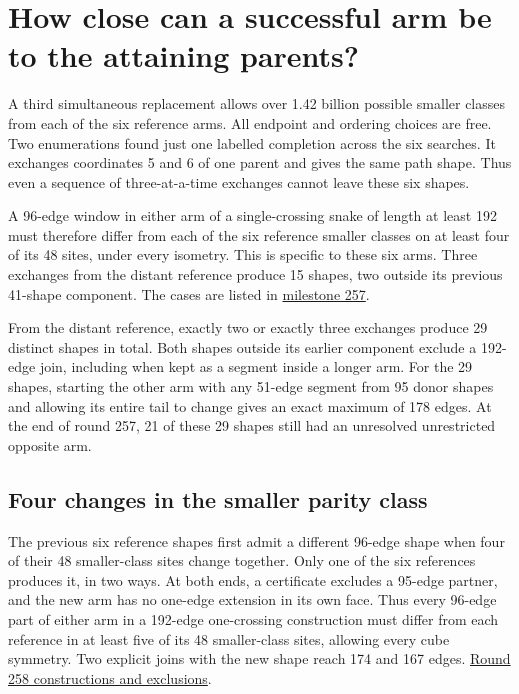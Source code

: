 \documentclass[11pt,a4paper]{article}
\begin{document}
\section{How close can a successful arm be to the attaining parents?}
A third simultaneous replacement allows over 1.42 billion possible
smaller classes from each of the six reference arms. All endpoint and
ordering choices are free. Two enumerations found just one labelled
completion across the six searches. It exchanges coordinates 5 and 6
of one parent and gives the same path shape. Thus even a sequence of
three-at-a-time exchanges cannot leave these six shapes.

A 96-edge window in either arm of a single-crossing snake of length at
least 192 must therefore differ from each of the six reference smaller
classes on at least four of its 48 sites, under every isometry. This is
specific to these six arms. Three exchanges from the distant reference
produce 15 shapes, two outside its previous 41-shape component.
The cases are listed in \href{https://github.com/hironaka-iori/Snake-in-the-box-in-9/tree/main/milestones/257-three-exchange-parents}{milestone 257}.

From the distant reference, exactly two or exactly three exchanges
produce 29 distinct shapes in total. Both shapes outside its earlier
component exclude a 192-edge join, including when kept as a segment
inside a longer arm. For the 29 shapes, starting the other arm with
any 51-edge segment from 95 donor shapes and allowing its entire tail
to change gives an exact maximum of 178 edges. At the end of round 257, 21 of these 29 shapes still had an unresolved
unrestricted opposite arm.


\subsection{Four changes in the smaller parity class}
The previous six reference shapes first admit a different 96-edge
shape when four of their 48 smaller-class sites change together.
Only one of the six references produces it, in two ways. At both ends,
a certificate excludes a 95-edge partner, and the new arm has no
one-edge extension in its own face. Thus every 96-edge part of either
arm in a 192-edge one-crossing construction must differ from each
reference in at least five of its 48 smaller-class sites, allowing
every cube symmetry. Two explicit joins with the new shape reach
174 and 167 edges.
\href{https://github.com/hironaka-iori/Snake-in-the-box-in-9/tree/main/milestones/258-four-exchange-parents}{Round 258 constructions and exclusions}.
\end{document}
